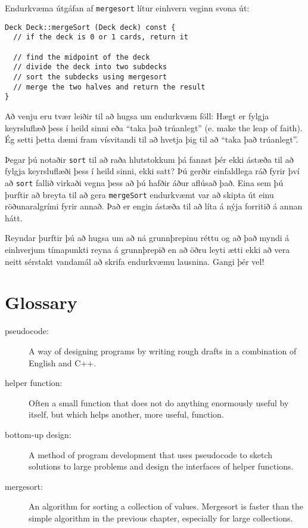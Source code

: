 Endurkvæma útgáfan af {\tt mergesort} lítur einhvern veginn svona út: 

\begin{verbatim}
Deck Deck::mergeSort (Deck deck) const {
  // if the deck is 0 or 1 cards, return it

  // find the midpoint of the deck
  // divide the deck into two subdecks
  // sort the subdecks using mergesort
  // merge the two halves and return the result
}
\end{verbatim}
%
Að venju eru tvær leiðir til að hugsa um endurkvæm föll:
Hægt er fylgja keyrsluflæð þess í heild sinni eða ``taka það trúanlegt'' (e. make the leap of faith).
Ég setti þetta dæmi fram vísvitandi til að hvetja þig til að ``taka það trúanlegt''.


Þegar þú notaðir {\tt sort} til að raða hlutstokkum þá fannst þér ekki ástæða til að fylgja keyrsluflæði þess í heild sinni, ekki satt?
Þú gerðir einfaldlega ráð fyrir því að {\tt sort} fallið virkaði vegna þess að þú hafðir áður aflúsað það. 
Eina sem þú þurftir að breyta til að gera {\tt mergeSort} endurkvæmt var að skipta út einu röðunaralgrími fyrir annað. 
Það er engin ástæða til að líta á nýja forritið á annan hátt. 

Reyndar þurftir þú að hugsa um að ná grunnþrepinu réttu og að það myndi á einhverjum tímapunkti reyna á grunnþrepið en að öðru leyti ætti ekki að vera neitt sérstakt vandamál að skrifa endurkvæmu lausnina.  Gangi þér vel!

\section{Glossary}

\begin{description}

\item[pseudocode:]  A way of designing programs by writing
rough drafts in a combination of English and C++.

\item[helper function:]  Often a small function that does not
do anything enormously useful by itself, but which helps
another, more useful, function.

\item[bottom-up design:]  A method of program development that
uses pseudocode to sketch solutions to large problems and
design the interfaces of helper functions.

\item[mergesort:]  An algorithm for sorting a collection of
values.  Mergesort is faster than the simple algorithm in
the previous chapter, especially for large collections.



\end{description}

